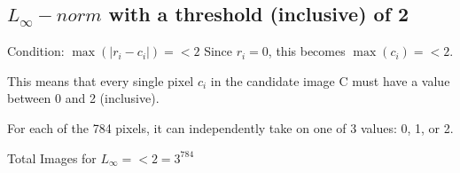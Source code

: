 \subsection*{$L_\infty-norm$ with a threshold (inclusive) of 2}

Condition: $\max(|r_i - c_i|) =< 2$
Since $r_i = 0$, this becomes $\max(c_i) =< 2$.

This means that every single pixel $c_i$ in the candidate image C must have a value between 0 and 2 (inclusive).

For each of the 784 pixels, it can independently take on one of 3 values: 0, 1, or 2.

Total Images for $ L_\infty =< 2 = 3^{784} $
